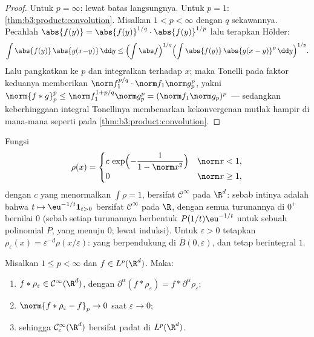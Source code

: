 \begin{proof}
Untuk $p = \infty$: lewat batas langsungnya. Untuk $p = 1$:
\cref{thm:b3:product:convolution}. Misalkan $1 < p < \infty$ dengan $q$
sekawannya. Pecahlah $\abs{f(y)} = \abs{f(y)}^{1/q}\cdot
\abs{f(y)}^{1/p}$ lalu terapkan Hölder:
\[
\int\abs{f(y)}\,\abs{g(x{-}y)}\,\dd y
\leq \Bigl(\int\abs f\Bigr)^{1/q}
\Bigl(\int\abs{f(y)}\,\abs{g(x - y)}^p\,\dd y\Bigr)^{1/p} .
\]
Lalu pangkatkan ke $p$ dan integralkan terhadap $x$; maka Tonelli pada
faktor keduanya memberikan $\norm f_1^{p/q}\cdot\norm f_1\norm g_p^p$,
yakni $\norm{f*g}_p^p \leq \norm f_1^{1 + p/q}\norm g_p^p =
(\norm f_1\norm g_p)^p$ --- sedangkan keberhinggaan integral
Tonellinya membenarkan kekonvergenan mutlak hampir di mana-mana seperti pada
\cref{thm:b3:product:convolution}.
\end{proof}

\begin{definition}[Pemulus]\label{def:b3:lp:mollifier}
Fungsi
\[
\rho(x) = \begin{cases}
c\,\exp\Bigl(-\dfrac{1}{1 - \norm x^2}\Bigr) & \norm x < 1,\\
0 & \norm x \geq 1,
\end{cases}
\]
dengan $c$ yang menormalkan $\int\rho = 1$, bersifat $\mathcal C^\infty$ pada
$\R^d$: sebab intinya adalah bahwa $t \mapsto \eu^{-1/t}\mathbf
1_{t>0}$ bersifat $\mathcal C^\infty$ pada $\R$, dengan semua turunannya di
$0^+$ bernilai $0$ (sebab setiap turunannya berbentuk $P(1/t)\eu^{-1/t}$ untuk sebuah
polinomial $P$, yang menuju $0$; lewat induksi). Untuk
$\varepsilon > 0$ tetapkan $\rho_\varepsilon(x) =
\varepsilon^{-d}\rho(x/\varepsilon)$: yang berpendukung di $\bar B(0,
\varepsilon)$, dan tetap berintegral $1$.
\end{definition}

\begin{theorem}[Peregularan]\label{thm:b3:lp:regularization}
Misalkan $1 \leq p < \infty$ dan $f \in L^p(\R^d)$. Maka:
\begin{enumerate}
  \item $f * \rho_\varepsilon \in \mathcal C^\infty(\R^d)$,
        dengan $\partial^\alpha(f * \rho_\varepsilon) = f *
        \partial^\alpha\rho_\varepsilon$;
  \item $\norm{f * \rho_\varepsilon - f}_p \to 0$ saat
        $\varepsilon \to 0$;
  \item sehingga $\mathcal C^\infty_c(\R^d)$ bersifat padat di
        $L^p(\R^d)$.
\end{enumerate}
\end{theorem}

